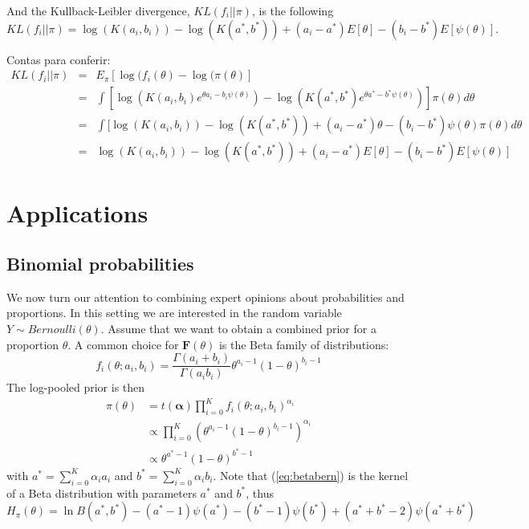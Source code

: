 \documentclass[a4paper, notitlepage, 11pt]{article}
\begin{document}
And the Kullback-Leibler divergence, $KL(f_i || \pi)$, is the following
\begin{equation} \label{eq:KLpriorEF}
KL(f_i || \pi) = \log( K(a_i,b_i)) - \log(K(a^*,b^*)) + (a_i - a^*) E[\theta] - (b_i - b^*) E[\psi(\theta)] .
\end{equation}

Contas para conferir:
\begin{eqnarray*} 
KL(f_i || \pi) & = & E_\pi[\log(f_i(\theta)-\log(\pi(\theta)] \\
              & = & \int [\log( K(a_i,b_i) e^{\theta a_i - b_i \psi(\theta)}) - \log(K(a^*,b^*) e^{\theta a^* - b^* \psi(\theta)}) ] \pi(\theta) d\theta \\
              & = & \int [\log( K(a_i,b_i)) - \log(K(a^*,b^*)) + (a_i - a^*) \theta  - (b_i - b^*) \psi(\theta) \pi(\theta) d\theta \\
              & = & \log( K(a_i,b_i)) - \log(K(a^*,b^*)) + (a_i - a^*) E[\theta] - (b_i - b^*) E[\psi(\theta)] 
\end{eqnarray*}


\section*{Applications}
\label{sec:apps}

\subsection*{Binomial probabilities}
\label{sec:beta}
We now turn our attention to combining expert opinions about probabilities and proportions.
In this setting we are interested in the random variable $Y\sim Bernoulli(\theta)$.
Assume that we want to obtain a combined prior for a proportion $\theta$.
A common choice for $\mathbf{F}(\theta)$ is the Beta family of distributions:
$$f_i(\theta;a_i, b_i) = \frac{\Gamma(a_i + b_i)}{\Gamma(a_i b_i)} \theta^{a_i-1}(1-\theta)^{b_i-1}$$
The log-pooled prior is then
\begin{align}
\pi(\theta)&= t(\boldsymbol\alpha)\prod_{i=0}^{K}f_i(\theta;a_i,b_i)^{\alpha_i}\\
&\propto \prod_{i=0}^{K} \left(\theta^{a_i-1}(1-\theta)^{b_i-1} \right)^{\alpha_i}\\
\label{eq:betabern}
&\propto \theta^{a^*-1}(1-\theta)^{b^*-1}
\end{align}
with $a^* =\sum_{i=0}^{K}\alpha_ia_i$ and $b^* = \sum_{i=0}^{K}\alpha_ib_i$.
Note that (\ref{eq:betabern}) is the kernel of a Beta distribution with parameters $a^*$ and $b^*$, thus 
\begin{equation}
 \label{eq:entropybeta}
 H_{\pi}(\theta) = \ln B(a^*,b^*) - (a^*-1)\psi(a^*) - (b^*-1)\psi(b^*) + (a^*+b^* -2)\psi(a^*+b^*)
\end{equation}
\end{document}
